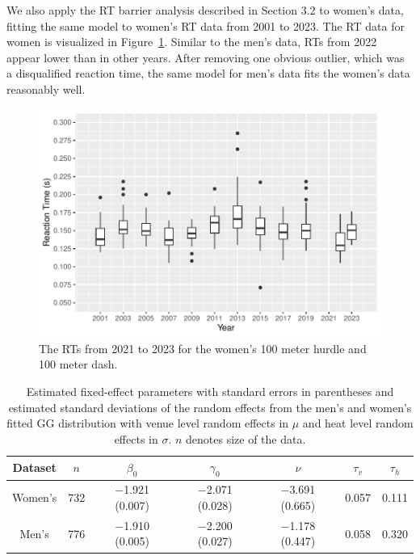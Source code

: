 \documentclass[12pt, letterpaper]{article}
\begin{document}
We also apply the RT barrier analysis described in Section 3.2 to women's data,
fitting the same model to women's RT data from 2001 to 2023.
The RT data for women is visualized in Figure~\ref{fig:WomensBoxplot}.
Similar to the men's data, RTs from 2022 appear lower than in other
years. After removing one obvious outlier, which was a disqualified
reaction time, the same model for men's data fits the women's data
reasonably well.

\begin{figure}[tbp]
  \centering
  \includegraphics[width=\textwidth]{WomensBoxplot}
  \caption{The RTs from 2021 to 2023 for the women's 100 meter hurdle
  and 100 meter dash.}
  \label{fig:WomensBoxplot}
\end{figure}


\begin{table}
  \centering
  \caption{Estimated fixed-effect parameters with standard errors in
    parentheses and estimated standard deviations of the random effects from the men's and
    women's fitted GG distribution with venue level random
    effects in $\mu$ and heat level random effects in $\sigma$. $n$ denotes
    size of the data.}
  \label{tab:womensfit}
  \begin{tabular}{c c c c c c c}
    \toprule
    Dataset & $n$ & $\beta_0$ & $\gamma_0$ & $\nu$ & $\tau_v$ & $\tau_h$ \\
    \midrule
    Women's & 732 & $-$1.921 (0.007) & $-$2.071 (0.028) & $-$3.691 (0.665) & 0.057 & 0.111 \\
    Men's & 776 & $-$1.910 (0.005) & $-$2.200 (0.027) & $-$1.178 (0.447) & 0.058 & 0.320 \\
    \bottomrule
  \end{tabular}
\end{table}
\end{document}

